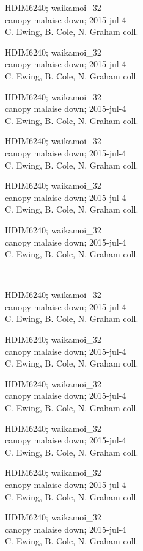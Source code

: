 \documentclass[2pt]{extarticle}
\begin{document}
\noindent
\parbox{0.16\textwidth}{\tiny \raggedright \rule[-0.3\baselineskip]{0pt}{10pt}HDIM6240; waikamoi\_32\\ canopy malaise down; 2015-jul-4\\ C. Ewing, B. Cole, N. Graham coll.}
\parbox{0.16\textwidth}{\tiny \raggedright \rule[-0.3\baselineskip]{0pt}{10pt}HDIM6240; waikamoi\_32\\ canopy malaise down; 2015-jul-4\\ C. Ewing, B. Cole, N. Graham coll.}
\parbox{0.16\textwidth}{\tiny \raggedright \rule[-0.3\baselineskip]{0pt}{10pt}HDIM6240; waikamoi\_32\\ canopy malaise down; 2015-jul-4\\ C. Ewing, B. Cole, N. Graham coll.}
\parbox{0.16\textwidth}{\tiny \raggedright \rule[-0.3\baselineskip]{0pt}{10pt}HDIM6240; waikamoi\_32\\ canopy malaise down; 2015-jul-4\\ C. Ewing, B. Cole, N. Graham coll.}
\parbox{0.16\textwidth}{\tiny \raggedright \rule[-0.3\baselineskip]{0pt}{10pt}HDIM6240; waikamoi\_32\\ canopy malaise down; 2015-jul-4\\ C. Ewing, B. Cole, N. Graham coll.}
\parbox{0.16\textwidth}{\tiny \raggedright \rule[-0.3\baselineskip]{0pt}{10pt}HDIM6240; waikamoi\_32\\ canopy malaise down; 2015-jul-4\\ C. Ewing, B. Cole, N. Graham coll.} \\ 
\vspace{0.001in} 

\noindent
\parbox{0.16\textwidth}{\tiny \raggedright \rule[-0.3\baselineskip]{0pt}{10pt}HDIM6240; waikamoi\_32\\ canopy malaise down; 2015-jul-4\\ C. Ewing, B. Cole, N. Graham coll.}
\parbox{0.16\textwidth}{\tiny \raggedright \rule[-0.3\baselineskip]{0pt}{10pt}HDIM6240; waikamoi\_32\\ canopy malaise down; 2015-jul-4\\ C. Ewing, B. Cole, N. Graham coll.}
\parbox{0.16\textwidth}{\tiny \raggedright \rule[-0.3\baselineskip]{0pt}{10pt}HDIM6240; waikamoi\_32\\ canopy malaise down; 2015-jul-4\\ C. Ewing, B. Cole, N. Graham coll.}
\parbox{0.16\textwidth}{\tiny \raggedright \rule[-0.3\baselineskip]{0pt}{10pt}HDIM6240; waikamoi\_32\\ canopy malaise down; 2015-jul-4\\ C. Ewing, B. Cole, N. Graham coll.}
\parbox{0.16\textwidth}{\tiny \raggedright \rule[-0.3\baselineskip]{0pt}{10pt}HDIM6240; waikamoi\_32\\ canopy malaise down; 2015-jul-4\\ C. Ewing, B. Cole, N. Graham coll.}
\parbox{0.16\textwidth}{\tiny \raggedright \rule[-0.3\baselineskip]{0pt}{10pt}HDIM6240; waikamoi\_32\\ canopy malaise down; 2015-jul-4\\ C. Ewing, B. Cole, N. Graham coll.} \\ 
\vspace{0.001in} 
\end{document}
